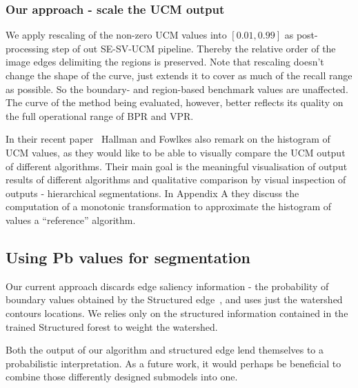 \subsubsection*{Our approach - scale the UCM output} %
We apply rescaling of the non-zero UCM values into $[0.01, 0.99]$ as post-processing step of out SE-SV-UCM pipeline. Thereby the relative order of the image edges delimiting the regions is preserved. Note that rescaling doesn't change the shape of the curve, just extends it to cover as much of the recall range as possible. So the boundary- and region-based benchmark values are unaffected. The curve of the method being evaluated, however, better reflects its quality on the full operational range of BPR and VPR.

In their recent paper~\cite{Hallman2014} Hallman and Fowlkes also remark on the histogram of UCM values, as they would like to be able to visually compare the UCM output of different algorithms. Their main goal is the meaningful visualisation of output results of different algorithms and qualitative comparison by visual inspection of outputs - hierarchical segmentations. In Appendix A they discuss the computation of a monotonic transformation to approximate the histogram of values \wrt a ``reference'' algorithm.

\subsection*{Using Pb values for segmentation} %
Our current approach discards edge saliency information - the probability of boundary values obtained by the Structured edge~\cite{DollarICCV13edges}, and uses just the watershed contours locations. We relies only on the structured information contained in the trained Structured forest to weight the watershed.

Both the output of our algorithm and structured edge lend themselves to %
a probabilistic interpretation. As a future work, it would perhaps be beneficial to combine those differently designed submodels into one.

